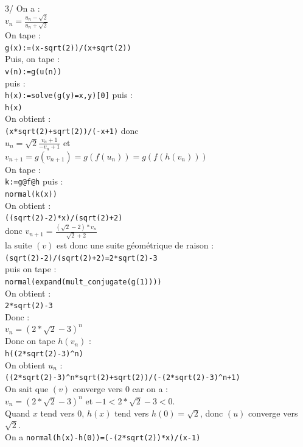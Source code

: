 \documentclass[a4paper,11pt]{book}
\begin{document}
3/ On a :\\
$\displaystyle v_n=\frac{u_n-\sqrt 2}{u_n+\sqrt 2}$\\
On tape :\\
{\tt g(x):=(x-sqrt(2))/(x+sqrt(2))}\\
Puis, on tape :\\
{\tt v(n):=g(u(n))}\\
puis :\\
{\tt h(x):=solve(g(y)=x,y)[0]}
puis :\\
{\tt h(x)}\\
On obtient :\\
{\tt (x*sqrt(2)+sqrt(2))/(-x+1)}
donc \\
$\displaystyle u_n=\sqrt 2 \frac{v_n+1}{-v_n+1}$ et\\
$v_{n+1}=g(v_{n+1})=g(f(u_n))=g(f(h(v_n)))$\\
On tape :\\
{\tt k:=g@f@h}
puis :\\
{\tt normal(k(x))}\\
On obtient :\\
{\tt ((sqrt(2)-2)*x)/(sqrt(2)+2)}\\
 donc $\displaystyle v_{n+1}=\frac{(\sqrt 2-2)*v_n}{\sqrt 2+2}$\\
la suite $(v)$ est donc une suite g\'eom\'etrique de raison :\\
{\tt (sqrt(2)-2)/(sqrt(2)+2)=2*sqrt(2)-3}\\
puis on tape :\\
{\tt normal(expand(mult\_conjugate(g(1))))}\\
On obtient :\\
{\tt 2*sqrt(2)-3}\\
Donc :\\
$v_n=(2*\sqrt 2-3)^n$\\
Donc on tape $h(v_n)$ :\\
{\tt h((2*sqrt(2)-3)\verb|^|n)}\\
On obtient $u_n$ :\\
{\tt ((2*sqrt(2)-3)\verb|^|n*sqrt(2)+sqrt(2))/(-(2*sqrt(2)-3)\verb|^|n+1)}\\
On sait que $(v)$ converge vers 0 car on a :\\
 $v_n=(2*\sqrt 2-3)^n$ et $-1<2*\sqrt 2-3<0$.\\
Quand $x$ tend vers 0, $h(x)$ tend vers $h(0)=\sqrt 2$, donc $(u)$ converge 
vers $\sqrt 2$.\\
On a {\tt normal(h(x)-h(0))=(-(2*sqrt(2))*x)/(x-1)}
\end{document}
